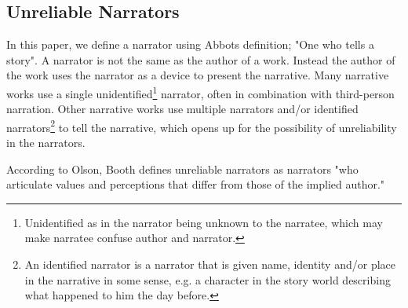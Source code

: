 \subsection{Unreliable Narrators}
In this paper, we define a narrator using Abbots definition; "One who tells a story"\cite[p. 238]{Abbot}. A narrator is not the same as the author of a work. Instead the author of the work uses the narrator as a device to present the narrative. Many narrative works use a single unidentified\footnote{Unidentified as in the narrator being unknown to the narratee, which may make narratee confuse author and narrator.} narrator, often in combination with third-person narration. Other narrative works use multiple narrators and/or identified narrators\footnote{An identified narrator is a narrator that is given name, identity and/or place in the narrative in some sense, e.g. a character in the story world describing what happened to him the day before.} to tell the narrative, which opens up for the possibility of unreliability in the narrators.

According to Olson, Booth defines unreliable narrators as narrators "who articulate values and perceptions that differ from those of the implied author."\cite[p. 94]{Olson}